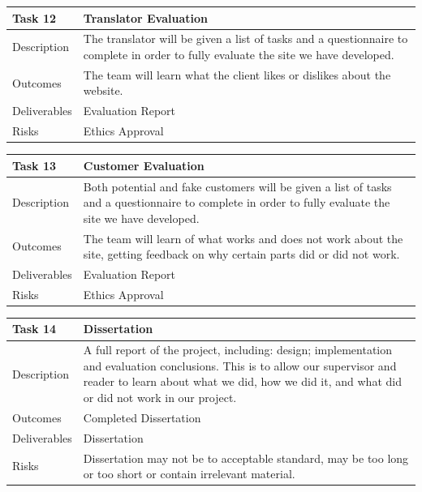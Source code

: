 \documentclass{l3proj}
\begin{document}
\begin{center}
    \begin{tabular}{ | l | p{12cm} |}
    \hline	
    Task 12 & Translator Evaluation \\ \hline
    Description & The translator will be given a list of tasks and a questionnaire to complete in order to fully evaluate the site we have developed. \\ \hline   
    Outcomes & The team will learn what the client likes or dislikes about the website. \\ \hline
    Deliverables & Evaluation Report \\ \hline
    Risks & Ethics Approval \\ 
    \hline
    \end{tabular}
\end{center}

\begin{center}
    \begin{tabular}{ | l | p{12cm} |}
    \hline	
    Task 13 & Customer Evaluation \\ \hline
    Description & Both potential and fake customers will be given a list of tasks and a questionnaire to complete in order to fully evaluate the site we have developed. \\ \hline   
    Outcomes & The team will learn of what works and does not work about the site, getting feedback on why certain parts did or did not work. \\ \hline
    Deliverables & Evaluation Report \\ \hline
    Risks & Ethics Approval \\ 
    \hline
    \end{tabular}
\end{center}

\begin{center}
    \begin{tabular}{ | l | p{12cm} |}
    \hline	
    Task 14 & Dissertation \\ \hline
    Description & A full report of the project, including: design; implementation and evaluation conclusions. This is to allow our supervisor and reader to learn about what we did, how we did it, and what did or did not work in our project. \\ \hline   
    Outcomes & Completed Dissertation \\ \hline
    Deliverables & Dissertation \\ \hline
    Risks & Dissertation may not be to acceptable standard, may be too long or too short or contain irrelevant material. \\ 
    \hline
    \end{tabular}
\end{center}
\end{document}
